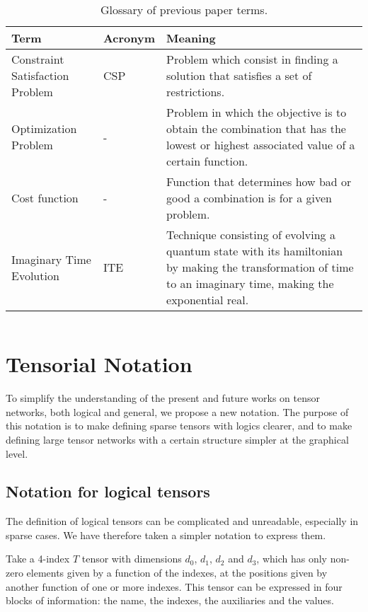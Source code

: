 \begin{table}[h]
    \centering
    \begin{tabular}{|p{4cm}|l|p{8cm}|}
         \hline
         Term & Acronym & Meaning \\
         \hline
         Constraint Satisfaction Problem & CSP & Problem which consist in finding a solution
that satisfies a set of restrictions.\\
         \hline
         Optimization Problem & - & Problem in which the objective is to obtain the combination that has the lowest or highest associated value of a certain function.\\
         \hline
         Cost function & - & Function that determines how bad or good a combination is for a given problem.\\
         \hline
         Imaginary Time Evolution & ITE & Technique consisting of evolving a quantum state with its hamiltonian by making the transformation of time to an imaginary time, making the exponential real. \\
         \hline
    \end{tabular}
    \caption{Glossary of previous paper terms.}
    \label{tab: Glossary old}
\end{table}


\newpage
$ $

\newpage

\section{Tensorial Notation}
To simplify the understanding of the present and future works on tensor networks, both logical and general, we propose a new notation. The purpose of this notation is to make defining sparse tensors with logics clearer, and to make defining large tensor networks with a certain structure simpler at the graphical level.

\subsection{Notation for logical tensors}
The definition of logical tensors can be complicated and unreadable, especially in sparse cases. We have therefore taken a simpler notation to express them.

Take a 4-index $T$ tensor with dimensions $d_0$, $d_1$, $d_2$ and $d_3$, which has only non-zero elements given by a function of the indexes, at the positions given by another function of one or more indexes. This tensor can be expressed in four blocks of information: the name, the indexes, the auxiliaries and the values.


